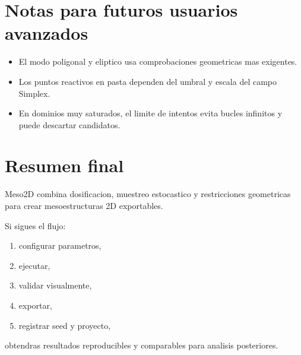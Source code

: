 \documentclass[11pt,a4paper]{article}
\begin{document}
\section{Notas para futuros usuarios avanzados}
\begin{itemize}[leftmargin=1.5em]
  \item El modo poligonal y eliptico usa comprobaciones geometricas mas exigentes.
  \item Los puntos reactivos en pasta dependen del umbral y escala del campo Simplex.
  \item En dominios muy saturados, el limite de intentos evita bucles infinitos y puede descartar candidatos.
\end{itemize}

\section{Resumen final}
Meso2D combina dosificacion, muestreo estocastico y restricciones geometricas para crear mesoestructuras 2D exportables.

Si sigues el flujo:
\begin{enumerate}[leftmargin=1.7em]
  \item configurar parametros,
  \item ejecutar,
  \item validar visualmente,
  \item exportar,
  \item registrar seed y proyecto,
\end{enumerate}
obtendras resultados reproducibles y comparables para analisis posteriores.
\end{document}
